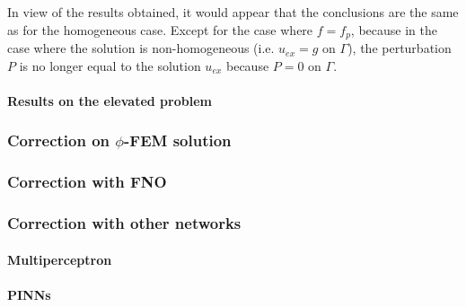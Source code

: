In view of the results obtained, it would appear that the conclusions are the same as for the homogeneous case. Except for the case where $f=f_p$, because in the case where the solution is non-homogeneous (i.e. $u_{ex}=g$ on $\Gamma$), the perturbation $P$ is no longer equal to the solution $u_{ex}$ because $P=0$ on $\Gamma$.

\paragraph{Results on the elevated problem} \label{Corr.results.disturbed.reh} 



\subsubsection{Correction on $\phi$-FEM solution} \label{Corr.results.phifem}


\subsubsection{Correction with FNO} \label{Corr.results.FNO}

\subsubsection{Correction with other networks} \label{Corr.results.neural_net}

\paragraph{Multiperceptron} \label{Corr.results.neural_net.multiperceptron}

\paragraph{PINNs} \label{Corr.results.neural_net.PINNs}